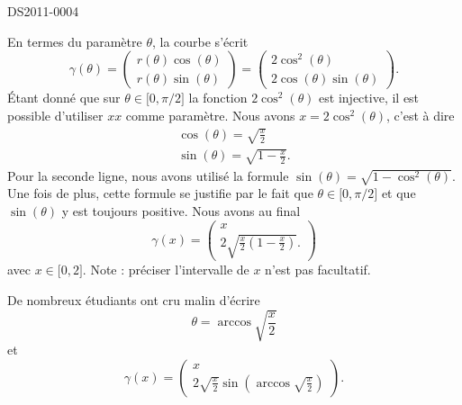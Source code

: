 \begin{corrige}{DS2011-0004}
  
    En termes du paramètre \( \theta\), la courbe s'écrit
    \begin{equation}
        \gamma(\theta)=\begin{pmatrix}
            r(\theta)\cos(\theta)    \\ 
            r(\theta)\sin(\theta)    
        \end{pmatrix}=
        \begin{pmatrix}
            2\cos^2(\theta)    \\ 
            2\cos(\theta)\sin(\theta)    
        \end{pmatrix}.
    \end{equation}
    Étant donné que sur \( \theta\in\mathopen[ 0 , \pi/2 \mathclose]\) la fonction \( 2\cos^2(\theta)\) est injective, il est possible d'utiliser \( x x\) comme paramètre. Nous avons \( x=2\cos^2(\theta)\), c'est à dire
    \begin{subequations}
        \begin{align}
            \cos(\theta)=\sqrt{\frac{ x }{2}}\\
            \sin(\theta)=\sqrt{1-\frac{ x }{2}}.
        \end{align}
    \end{subequations}
    Pour la seconde ligne, nous avons utilisé la formule \( \sin(\theta)=\sqrt{1-\cos^2(\theta)}\). Une fois de plus, cette formule se justifie par le fait que \( \theta\in\mathopen[ 0 , \pi/2 \mathclose]\) et que \( \sin(\theta)\) y est toujours positive. Nous avons au final
    \begin{equation}
        \gamma(x)=\begin{pmatrix}
            x    \\ 
            2\sqrt{\frac{ x }{2}\left( 1-\frac{ x }{2} \right)}.    
        \end{pmatrix}
    \end{equation}
    avec \( x\in\mathopen[ 0 , 2 \mathclose]\). Note : préciser l'intervalle de \( x \) n'est pas facultatif.

    De nombreux étudiants ont cru malin d'écrire
    \begin{equation}
        \theta=\arccos\sqrt{\frac{ x }{ 2 }}
    \end{equation}
    et
    \begin{equation}        \label{EqCartfgxygammaqnn}
        \gamma(x)=\begin{pmatrix}
            x    \\ 
            2\sqrt{\frac{ x }{2}}\sin\left( \arccos\sqrt{\frac{ x }{2}} \right)
        \end{pmatrix}.
    \end{equation}
    

\end{corrige}

